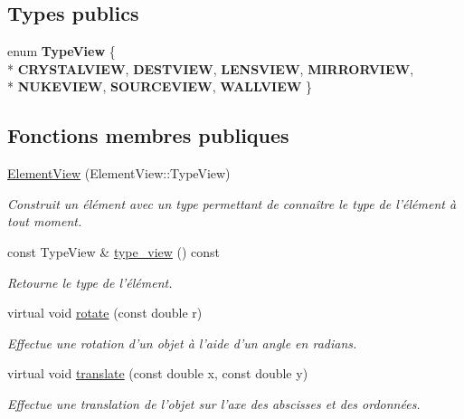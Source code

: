 \subsection*{Types publics}
\begin{DoxyCompactItemize}
\item 
\hypertarget{classElementView_ae8b9890c6c8501a7a759896cae9ab7a6}{enum {\bfseries Type\+View} \{ \\*
{\bfseries C\+R\+Y\+S\+T\+A\+L\+V\+I\+E\+W}, 
{\bfseries D\+E\+S\+T\+V\+I\+E\+W}, 
{\bfseries L\+E\+N\+S\+V\+I\+E\+W}, 
{\bfseries M\+I\+R\+R\+O\+R\+V\+I\+E\+W}, 
\\*
{\bfseries N\+U\+K\+E\+V\+I\+E\+W}, 
{\bfseries S\+O\+U\+R\+C\+E\+V\+I\+E\+W}, 
{\bfseries W\+A\+L\+L\+V\+I\+E\+W}
 \}}\label{classElementView_ae8b9890c6c8501a7a759896cae9ab7a6}

\end{DoxyCompactItemize}
\subsection*{Fonctions membres publiques}
\begin{DoxyCompactItemize}
\item 
\hypertarget{classElementView_adb918caf5a5fcc4bd945cd3cd2596f8c}{\hyperlink{classElementView_adb918caf5a5fcc4bd945cd3cd2596f8c}{Element\+View} (Element\+View\+::\+Type\+View)}\label{classElementView_adb918caf5a5fcc4bd945cd3cd2596f8c}

\begin{DoxyCompactList}\small\item\em Construit un élément avec un type permettant de connaître le type de l'élément à tout moment. \end{DoxyCompactList}\item 
const Type\+View \& \hyperlink{classElementView_a30b7a26b428be68dcc4d8f72a0f9cd0b}{type\+\_\+view} () const 
\begin{DoxyCompactList}\small\item\em Retourne le type de l'élément. \end{DoxyCompactList}\item 
virtual void \hyperlink{classElementView_a18589409290f23edffdaeccdd7acb015}{rotate} (const double r)
\begin{DoxyCompactList}\small\item\em Effectue une rotation d’un objet à l’aide d’un angle en radians. \end{DoxyCompactList}\item 
virtual void \hyperlink{classElementView_a69a525cb674a36e33be6a8b7a6e4b83c}{translate} (const double x, const double y)
\begin{DoxyCompactList}\small\item\em Effectue une translation de l’objet sur l’axe des abscisses et des ordonnées. \end{DoxyCompactList}\end{DoxyCompactItemize}


